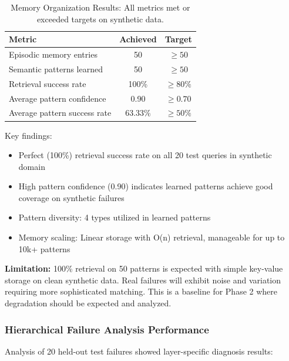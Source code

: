 \documentclass[11pt]{article}
\begin{document}
\begin{table}[h!]
\centering
\begin{tabular}{lcc}
\toprule
\textbf{Metric} & \textbf{Achieved} & \textbf{Target} \\
\midrule
Episodic memory entries & 50 & $\geq 50$ \\
Semantic patterns learned & 50 & $\geq 50$ \\
Retrieval success rate & 100\% & $\geq 80\%$ \\
Average pattern confidence & 0.90 & $\geq 0.70$ \\
Average pattern success rate & 63.33\% & $\geq 50\%$ \\
\bottomrule
\end{tabular}
\caption{Memory Organization Results: All metrics met or exceeded targets on synthetic data.}
\label{tab:memory_results}
\end{table}

Key findings:
\begin{itemize}
    \item Perfect (100\%) retrieval success rate on all 20 test queries in synthetic domain
    \item High pattern confidence (0.90) indicates learned patterns achieve good coverage on synthetic failures
    \item Pattern diversity: 4 types utilized in learned patterns
    \item Memory scaling: Linear storage with O(n) retrieval, manageable for up to 10k+ patterns
\end{itemize}

\textbf{Limitation:} 100\% retrieval on 50 patterns is expected with simple key-value storage on clean synthetic data. Real failures will exhibit noise and variation requiring more sophisticated matching. This is a baseline for Phase 2 where degradation should be expected and analyzed.

\subsubsection{Hierarchical Failure Analysis Performance}

Analysis of 20 held-out test failures showed layer-specific diagnosis results:
\end{document}
